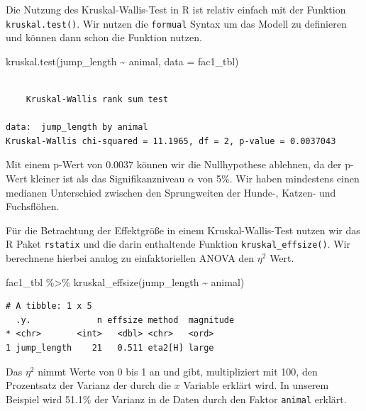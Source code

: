 \documentclass[
  letterpaper,
]{scrbook}
\newenvironment{Shaded}{\begin{snugshade}}{\end{snugshade}}
\newcommand{\AttributeTok}[1]{\textcolor[rgb]{0.40,0.45,0.13}{#1}}
\newcommand{\FunctionTok}[1]{\textcolor[rgb]{0.28,0.35,0.67}{#1}}
\newcommand{\NormalTok}[1]{\textcolor[rgb]{0.00,0.23,0.31}{#1}}
\newcommand{\SpecialCharTok}[1]{\textcolor[rgb]{0.37,0.37,0.37}{#1}}
\begin{document}
Die Nutzung des Kruskal-Wallis-Test in R ist relativ einfach mit der
Funktion \texttt{kruskal.test()}. Wir nutzen die \texttt{formual} Syntax
um das Modell zu definieren und können dann schon die Funktion nutzen.

\begin{Shaded}
\begin{Highlighting}[]
\FunctionTok{kruskal.test}\NormalTok{(jump\_length }\SpecialCharTok{\textasciitilde{}}\NormalTok{ animal, }\AttributeTok{data =}\NormalTok{ fac1\_tbl) }
\end{Highlighting}
\end{Shaded}

\begin{verbatim}

    Kruskal-Wallis rank sum test

data:  jump_length by animal
Kruskal-Wallis chi-squared = 11.1965, df = 2, p-value = 0.0037043
\end{verbatim}

Mit einem p-Wert von \(0.0037\) können wir die Nullhypothese ablehnen,
da der p-Wert kleiner ist als das Signifikanzniveau \(\alpha\) von 5\%.
Wir haben mindestens einen medianen Unterschied zwischen den
Sprungweiten der Hunde-, Katzen- und Fuchsflöhen.

Für die Betrachtung der Effektgröße in einem Kruskal-Wallis-Test nutzen
wir das R Paket \texttt{rstatix} und die darin enthaltende Funktion
\texttt{kruskal\_effsize()}. Wir berechnene hierbei analog zu
einfaktoriellen ANOVA den \(\eta^2\) Wert.

\begin{Shaded}
\begin{Highlighting}[]
\NormalTok{fac1\_tbl }\SpecialCharTok{\%\textgreater{}\%} \FunctionTok{kruskal\_effsize}\NormalTok{(jump\_length }\SpecialCharTok{\textasciitilde{}}\NormalTok{ animal)}
\end{Highlighting}
\end{Shaded}

\begin{verbatim}
# A tibble: 1 x 5
  .y.             n effsize method  magnitude
* <chr>       <int>   <dbl> <chr>   <ord>    
1 jump_length    21   0.511 eta2[H] large    
\end{verbatim}

Das \(\eta^2\) nimmt Werte von 0 bis 1 an und gibt, multipliziert mit
100, den Prozentsatz der Varianz der durch die \(x\) Variable erklärt
wird. In unserem Beispiel wird 51.1\% der Varianz in de Daten durch den
Faktor \texttt{animal} erklärt.
\end{document}
